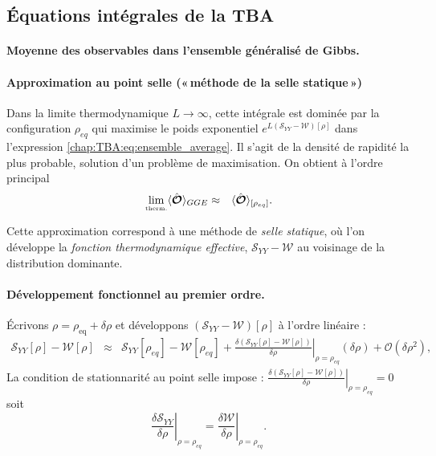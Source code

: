 %
\subsection{Équations intégrales de la TBA}

\paragraph{Moyenne des observables dans l’ensemble généralisé de Gibbs.}

\paragraph{Approximation au point selle («\,méthode de la selle statique\,»)}

Dans la limite thermodynamique \( L \to \infty \), cette intégrale est dominée par la configuration \( \rho_{eq} \) qui maximise le poids exponentiel $e^{L(\mathcal{S}_{YY}-\mathcal{W})[\rho]}$  dans l'expression \eqref{chap:TBA:eq:ensemble_average}. Il s’agit de la densité de rapidité la plus probable, solution d’un problème de maximisation. On obtient à l’ordre principal
\begin{eqnarray}
	\underset{\mbox{\tiny therm.}}{\lim} \langle \hat{\bm{\mathcal{O}}} \rangle_{GGE} & \approx &  \langle\hat{\bm{\mathcal{O}}}\rangle_{[\rho_{eq} ]}.	
	\label{chap:TBA:eq:ensemble_average:approx}
\end{eqnarray}

Cette approximation correspond à une méthode de \textit{selle statique}, où l’on développe la \emph{fonction thermodynamique effective}, $\mathcal{S}_{YY}-\mathcal{W}$  au voisinage de la distribution dominante.


\paragraph{Développement fonctionnel au premier ordre.}

Écrivons
\(
\rho=\rho_{\text{eq}}+\delta\rho
\)
et développons $(\mathcal{S}_{YY}-\mathcal{W})[\rho]$ à l’ordre linéaire :
\begin{eqnarray*}
	\mathcal{S}_{YY}[\rho] - \mathcal{W}[\rho] & \approx & \mathcal{S}_{YY}[ \rho_{eq}] - \mathcal{W}[ \rho_{eq}] +  \left. \frac{\delta (\mathcal{S}_{YY}[\rho] - \mathcal{W}[\rho]) }{\delta \rho} \right|_{\rho = \rho_{eq} }	(\delta \rho) + \mathcal{O}(\delta \rho^2 ) ,
	\label{chap:TBA:eq:action}	
\end{eqnarray*}	
La condition de stationnarité au point selle impose :
\(
	\left. \frac{\delta (\mathcal{S}_{YY}[\rho] - \mathcal{W}[\rho]) }{\delta \rho} \right|_{\rho = \rho_{eq} }	  =  0  	
\)
soit 
\begin{equation}
\left. \frac{\delta \mathcal{S}_{YY}}{\delta \rho} \right|_{\rho = \rho_{eq}} = \left. \frac{\delta \mathcal{W}}{\delta \rho} \right|_{\rho = \rho_{eq}}. \label{chap:TBA:eq:stationnarite}
\end{equation}

